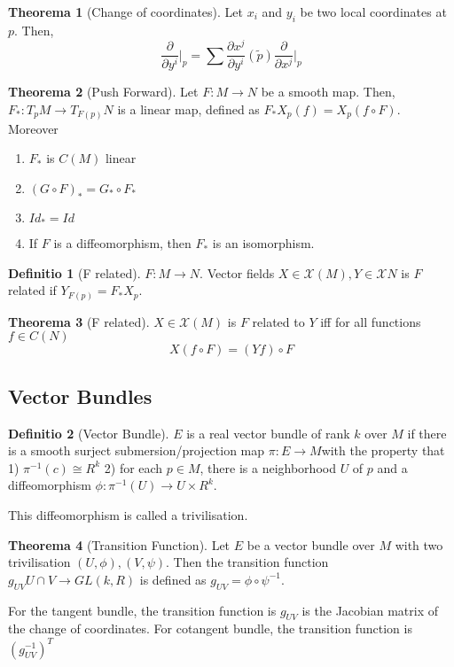 \documentclass[12pt, a4paper]{article}
\theoremstyle{definition}
\newtheorem{theorem}{Theorema}[section]
\newtheorem{definition}{Definitio}[section]
\theoremstyle{remark}
\begin{document}
\begin{theorem}[Change of coordinates]
	Let $x_i$ and $y_i$ be two local coordinates at $p$. Then, 
	$$
	\frac{\partial}{\partial y^i}\Big\rvert_p = \sum \frac{\partial x^j}{\partial y^i}(\tilde{p})\frac{\partial}{\partial x^j}\Big\rvert_p
	$$
\end{theorem}

\begin{theorem}[Push Forward]
	Let $F: M \rightarrow N$ be a smooth map. Then, $F_*: T_pM \rightarrow T_{F(p)}N$ is a linear map, defined as $F_*X_p(f) = X_p(f \circ F)$. 
	Moreover
	\begin{enumerate}
		\item $F_*$ is $C(M)$ linear 
		\item $(G \circ F)_* = G_* \circ F_*$ 
		\item $Id_* = Id$
		\item If $F$ is a diffeomorphism, then $F_*$ is an isomorphism.
	\end{enumerate}
\end{theorem}

\begin{definition}[F related]
	$F: M \rightarrow N$. Vector fields $X \in \mathscr{X}(M), Y \in \mathscr{X}{N}$ is $F$ related if $Y_{F(p)} = F_*X_p$.
\end{definition}

\begin{theorem}[F related]
	$X \in \mathscr{X}(M)$ is $F$ related to $Y$ iff for all functions $f \in C(N)$
	$$	
	X(f \circ F) = (Yf) \circ F
	$$

\end{theorem}

\subsection{Vector Bundles}

\begin{definition}[Vector Bundle]
	$E$ is a real vector bundle of rank $k$ over $M$ if there is a smooth surject submersion/projection map $\pi: E \rightarrow M$with the property that 1) $\pi^{-1}(c) \cong R^k$ 2) for each $p \in M$, there is a neighborhood $U$ of $p$ and a diffeomorphism $\phi: \pi^{-1}(U) \rightarrow U \times R^k$.

	This diffeomorphism is called a trivilisation.
\end{definition}

\begin{theorem}[Transition Function]
	Let $E$ be a vector bundle over $M$ with two trivilisation $(U, \phi), (V, \psi)$.
	Then the transition function $g_{UV} U \cap V \rightarrow GL(k, R)$ is defined as $g_{UV} = \phi \circ \psi^{-1}$.

	For the tangent bundle, the transition function is $g_{UV}$ is the Jacobian matrix of the change of coordinates. 
For cotangent bundle, the transition function is $(g_{UV}^{-1})^T$
\end{theorem}
\end{document}
